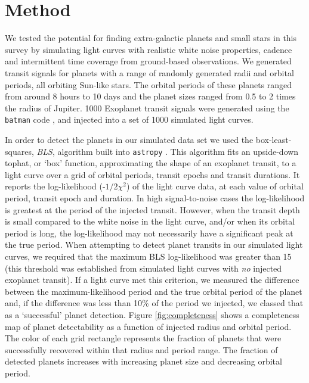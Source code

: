 
\section{Method}

We tested the potential for finding extra-galactic planets and small stars in
this survey by simulating light curves with realistic white noise properties,
cadence and intermittent time coverage from ground-based observations.
We generated transit signals for planets with a range of randomly generated
radii and orbital periods, all orbiting Sun-like stars.
The orbital periods of these planets ranged from around 8 hours to 10 days and
the planet sizes ranged from 0.5 to 2 times the radius of Jupiter.
1000 Exoplanet transit signals were generated using the {\tt batman} code
\citep{kreidberg2015}, and injected into a set of 1000 simulated light curves.

In order to detect the planets in our simulated data set we used the
box-least-squares, {\it BLS}, algorithm built into {\tt astropy}
\citep{astropy}.
This algorithm fits an upside-down tophat, or `box' function, approximating
the shape of an exoplanet transit, to a light curve over a grid of orbital
periods, transit epochs and transit durations.
It reports the log-likelihood (-$1/2\chi^2$) of the light curve data, at each
value of orbital period, transit epoch and duration.
In high signal-to-noise cases the log-likelihood is greatest at the period of
the injected transit.
However, when the transit depth is small compared to the white noise in the
light curve, and/or when its orbital period is long, the log-likelihood may not
necessarily have a significant peak at the true period.
When attempting to detect planet transits in our simulated light curves, we
required that the maximum BLS log-likelihood was greater than 15 (this
threshold was established from simulated light curves with {\it no} injected
exoplanet transit).
If a light curve met this criterion, we measured the difference between the
maximum-likelihood period and the true orbital period of the planet and, if
the difference was less than 10\% of the period we injected, we classed that
as a `successful' planet detection.
Figure \ref{fig:completeness} shows a completeness map of planet detectability
as a function of injected radius and orbital period.
The color of each grid rectangle represents the fraction of planets that were
successfully recovered within that radius and period range.
The fraction of detected planets increases with increasing planet size and
decreasing orbital period.

